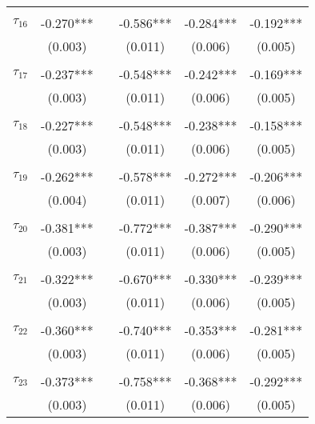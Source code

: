 \begin{tabular}{@{\extracolsep{-5pt}}lccccc}
                &           &&           &           &           \\[-2.1ex]
$\tau_{16}$     & -0.270*** && -0.586*** & -0.284*** & -0.192*** \\
                &  (0.003)  &&  (0.011)  &  (0.006)  &  (0.005)  \\
                &           &&           &           &           \\[-2.1ex]
$\tau_{17}$     & -0.237*** && -0.548*** & -0.242*** & -0.169*** \\
                &  (0.003)  &&  (0.011)  &  (0.006)  &  (0.005)  \\
                &           &&           &           &           \\[-2.1ex]
$\tau_{18}$     & -0.227*** && -0.548*** & -0.238*** & -0.158*** \\
                &  (0.003)  &&  (0.011)  &  (0.006)  &  (0.005)  \\
                &           &&           &           &           \\[-2.1ex]
$\tau_{19}$     & -0.262*** && -0.578*** & -0.272*** & -0.206*** \\
                &  (0.004)  &&  (0.011)  &  (0.007)  &  (0.006)  \\
                &           &&           &           &           \\[-2.1ex]
$\tau_{20}$     & -0.381*** && -0.772*** & -0.387*** & -0.290*** \\
                &  (0.003)  &&  (0.011)  &  (0.006)  &  (0.005)  \\
                &           &&           &           &           \\[-2.1ex]
$\tau_{21}$     & -0.322*** && -0.670*** & -0.330*** & -0.239*** \\
                &  (0.003)  &&  (0.011)  &  (0.006)  &  (0.005)  \\
                &           &&           &           &           \\[-2.1ex]
$\tau_{22}$     & -0.360*** && -0.740*** & -0.353*** & -0.281*** \\
                &  (0.003)  &&  (0.011)  &  (0.006)  &  (0.005)  \\
                &           &&           &           &           \\[-2.1ex]
$\tau_{23}$     & -0.373*** && -0.758*** & -0.368*** & -0.292*** \\
                &  (0.003)  &&  (0.011)  &  (0.006)  &  (0.005)  \\

\end{tabular}
